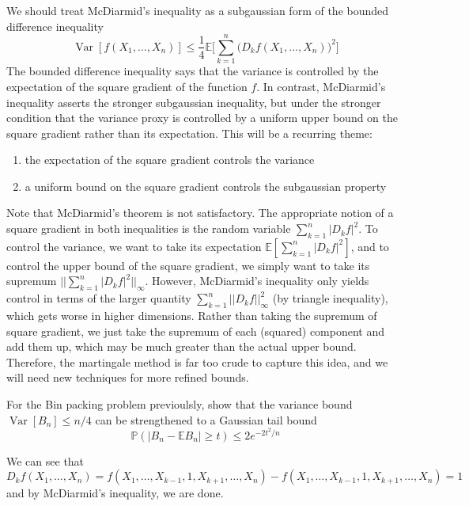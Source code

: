 \documentclass{article}
\DeclareMathOperator{\Var}{Var}
\theoremstyle{definition}
\theoremstyle{remark}
\theoremstyle{definition}
\begin{document}
  We should treat McDiarmid's inequality as a subgaussian form of the bounded difference inequality 
  \[\Var[ f(X_1, \ldots, X_n)] \leq \frac{1}{4} \mathbb{E} \bigg[ \sum_{k=1}^n \big(D_k f (X_1, \ldots, X_n)\big)^2 \bigg]\]
  The bounded difference inequality says that the variance is controlled by the expectation of the square gradient of the function $f$. In contrast, McDiarmid's inequality asserts the stronger subgaussian inequality, but under the stronger condition that the variance proxy is controlled by a uniform upper bound on the square gradient rather than its expectation. This will be a recurring theme: 
  \begin{enumerate}
      \item the expectation of the square gradient controls the variance 
      \item a uniform bound on the square gradient controls the subgaussian property
  \end{enumerate}
  Note that McDiarmid's theorem is not satisfactory. The appropriate notion of a square gradient in both inequalities is the random variable $\sum_{k=1}^n |D_k f|^2$. To control the variance, we want to take its expectation $\mathbb{E} [\sum_{k=1}^n |D_k f|^2]$, and to control the upper bound of the square gradient, we simply want to take its supremum $|| \sum_{k=1}^n |D_k f|^2||_\infty$. However, McDiarmid's inequality only yields control in terms of the larger quantity $\sum_{k=1}^n || D_k f||^2_\infty$ (by triangle inequality), which gets worse in higher dimensions. Rather than taking the supremum of square gradient, we just take the supremum of each (squared) component and add them up, which may be much greater than the actual upper bound. Therefore, the martingale method is far too crude to capture this idea, and we will need new techniques for more refined bounds. 

  \begin{exercise}
  For the Bin packing problem previoulsly, show that the variance bound $\Var[B_n] \leq n/4$ can be strengthened to a Gaussian tail bound 
  \[\mathbb{P}(|B_n - \mathbb{E} B_n| \geq t) \leq 2e^{-2t^2/n}\]
  \end{exercise}
  \begin{solution}
  We can see that 
  \[D_k f(X_1, \ldots, X_n) = f(X_1, \ldots, X_{k-1}, 1, X_{k+1}, \ldots, X_n) - f(X_1, \ldots, X_{k-1}, 1, X_{k+1}, \ldots, X_n) = 1\]
  and by McDiarmid's inequality, we are done. 
  \end{solution}

  \begin{exercise}

  \end{exercise}
\end{document}
